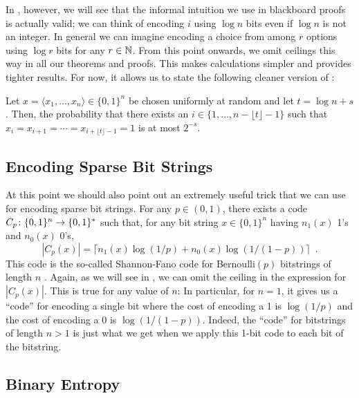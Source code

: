 \documentclass{patmorin}
\newenvironment{customthm}[1]
  {\renewcommand\theinnercustomthm{#1}\innercustomthm}
  {\endinnercustomthm}
\begin{document}
In , however, we will see that the informal intuition
we use in blackboard proofs is actually valid; we can think of encoding
$i$ using $\log n$ bits even if $\log n$ is not an integer.  In general
we can imagine encoding a choice from among $r$ options using $\log r$
bits for any $r\in\mathbb{N}$.  From this point onwards, we omit ceilings this
way in all our theorems and proofs. This makes calculations simpler and
provides tighter results.  For now, it allows us to state the following cleaner version of :

\begin{customthm}{\ref{thm:runs-i}b}
  Let $x=\langle x_1,\ldots,x_n\rangle\in\{0,1\}^n$ be chosen
  uniformly at random and let $t= \log n + s$. Then, the
  probability that there exists an $i\in\{1,\ldots,n-\lfloor t\rfloor-1\}$ such that
  $x_i=x_{i+1}=\cdots=x_{i+\lfloor t\rfloor-1}=1$ is at most $2^{-s}$.
\end{customthm}

\subsection{Encoding Sparse Bit Strings}

At this point we should also point out an extremely useful trick that
we can use for encoding sparse bit strings.  For any $p\in(0,1)$, there
exists a code $C_p\colon \{0,1\}^n\rightarrow \{0,1\}^*$ such that, for
any bit string $x\in\{0,1\}^n$ having $n_1(x)$ 1's and $n_0(x)$ 0's,
\[
    |C_p(x)| = \lceil n_1(x)\log(1/p) + n_0(x)\log(1/(1-p)) \rceil \enspace .
\]
This code is the so-called Shannon-Fano code for Bernoulli$(p)$ bitstrings
of length $n$ \cite{fano:transmission,shannon:mathematical}.  Again, as we will see in ,
we can omit the ceiling in the expression for $|C_p(x)|$.  This is true
for any value of $n$: In particular, for $n=1$, it gives us a ``code''
for encoding a single bit where the cost of encoding a 1 is $\log(1/p)$
and the cost of encoding a 0 is $\log(1/(1-p))$.  Indeed, the ``code'' for
bitstrings of length $n>1$ is just what we get when we apply this 1-bit
code to each bit of the bitstring.

\subsection{Binary Entropy}
\end{document}
